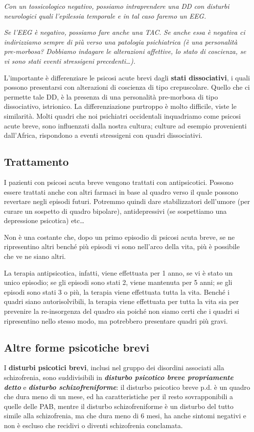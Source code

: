 \emph{Con un tossicologico negativo, possiamo intraprendere una DD con
disturbi neurologici quali l'epilessia temporale e in tal caso faremo un
\emph{EEG}.}

\emph{Se l'EEG è negativo, possiamo fare anche una \emph{TAC}. Se anche
essa è negativa ci indirizziamo sempre di più verso una patologia
psichiatrica (è una personalità pre-morbosa? Dobbiamo indagare le
alterazioni affettive, lo stato di coscienza, se vi sono stati eventi
stressigeni precedenti\ldots{}).}

L'importante è differenziare le psicosi acute brevi dagli
\textbf{stati dissociativi}, i quali possono presentarsi con alterazioni
di coscienza di tipo crepuscolare. Quello che ci permette tale DD, è la
presenza di una personalità pre-morbosa di tipo dissociativo,
istrionico. La differenziazione purtroppo è molto difficile, viste le
similarità. Molti quadri che noi psichiatri occidentali inquadriamo come
psicosi acute breve, sono influenzati dalla nostra cultura; culture ad
esempio provenienti dall'Africa, rispondono a eventi stressigeni con
quadri dissociativi. 

\subsection{Trattamento}

I pazienti con psicosi acuta breve vengono trattati con antipsicotici.
Possono essere trattati anche con altri farmaci in base al quadro verso
il quale possono revertare negli episodi futuri. Potremmo quindi dare
stabilizzatori dell'umore (per curare un sospetto di quadro bipolare),
antidepressivi (se sospettiamo una depressione psicotica) etc\ldots{}

Non è una costante che, dopo un primo episodio di psicosi acuta breve,
se ne ripresentino altri benché più episodi vi sono nell'arco della
vita, più è possibile che ve ne siano altri.

La terapia antipsicotica, infatti, viene effettuata per 1 anno, se vi è
stato un unico episodio; se gli episodi sono stati 2, viene mantenuta
per 5 anni; se gli episodi sono stati 3 o più, la terapia viene
effettuata tutta la vita. Benché i quadri siano autorisolvibili, la
terapia viene effettuata per tutta la vita sia per prevenire la
re-insorgenza del quadro sia poiché non siamo certi che i quadri si
ripresentino nello stesso modo, ma potrebbero presentare quadri più
gravi.

\subsection{Altre forme psicotiche brevi}

I \textbf{disturbi psicotici brevi}, inclusi nel gruppo dei disordini
associati alla schizofrenia, sono suddivisibili in
\textbf{\emph{disturbo psicotico breve propriamente detto}} e
\textbf{\emph{disturbo schizofreniforme}}: il disturbo psicotico breve
p.d. è un quadro che dura meno di un mese, ed ha caratteristiche per il
resto sovrapponibili a quelle delle PAB, mentre il disturbo
schizofreniforme è un disturbo del tutto simile alla schizofrenia, ma
che dura meno di 6 mesi, ha anche sintomi negativi e non è escluso che
recidivi o diventi schizofrenia conclamata.
